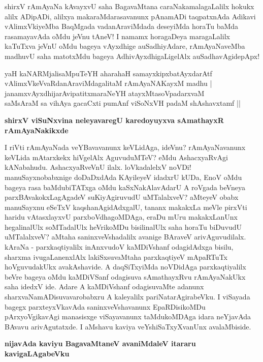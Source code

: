 \noindent
shirxV rAmAyaNa kAvayxvU saha BagavaMtana caraNakamalagaLalilx hokukx alilx ADi\-pADi, alilxya maka\-raMdarasavanunx pAnamADi taqpatxnAda Adikavi vAlimxVkiyeMba BaqMgada vadanAraviMdada deseyiMda hora\-Tu baMda rasamayavAda oMdu jeVnu tAneV! I namamx horagaDeya maragaLalilx kaTuTxva jeVnU oMdu bageya vAyxdhige auSadhiyAdare, rAmAyaNaveMba madhuvU saha matotxMdu bageya AdhivAyxdhigaLi\-gelAlx auSadhavAgidepApx!

\begin{shloka}
yaH kaNARMjalisaMpuTeYH aharahaH samayxkipxbatAyxdarAtf\\\label{238}
vAlimxVkeVvaRdanAraviMdagalitaM rAmAyaNAKayxM madhu |\\
janamxvAyxdhijarAvipatitxmaraNeYH atayxMtasoVpadarxvaM \\
saMsAraM sa vihAya gacaCxti pumAnf viSoNxVH padaM shAshavxtamf ||
\end{shloka}

{\bigskip
\noindent
{\large\bf shirxV viSuNxvina neleyavaregU karedoyuyxva sAmathayxR rAmAyaNakikxde}}\label{page238}
\medskip

\noindent
I riVti rAmAyaNada veYBavavanunx keVLidAga, ideVnu? rAmAyaNavanunx keVLida mAtarxkekx hiV\-gelAlx AguvuduMTeV? eMdu AshacxyaRvAgi kANabahudu. AshacxyaRveVnU ilalx. loVka\-dalelxV\- noVDi! manu\-Sayxnobabxnige doDaDxdAda KAyileyeV idadxrU kUDa, EnoV oMdu bageya rasa baMdubi\-TATxga oMdu kaSxNakAlavAdarU A roVgada beVneya parxBAvakokxLagAgadeV suKiyAgiru\-vudU uMTa\-lalxveV? aMteyeV obabx manuSayxnu eSeTxV kaqshanAgidAdxgalU, tananx makakxLa meVle pirxVti haridu vAtasxlayxvU parxboVdhagoMDAga, eraDu mUru makakxLanUnx hegalinalUlx soMTadalUlx heVrikoMDu bisilinalUlx saha horaTu biDuvudU uMTalalxveV? aMtaha saninxveVshadalilx avanige BAraveV arivAguvudilalx. kAraNa \-- parxkaqtiyalilx inAnxvudoV kaMDiVshanf odagidAdxga bisilu, sharxma ivugaLanenxlAlx lakiSxsuvaMtaha parxkaqtiyeV mApaRTuTx hoVguvudakUkx avakAshavide. A daqSiTxyiMda noVDidAga parxkaqtiyalilx beVre bageya oMdu kaMDiVSanf odagisuva sAmathayxRvu rAmAyaNakUkx saha idedxV ide. Adare A kaMDiVshanf odagisuvaMte adanunx sharxvaNamADisuvavarobabxru A kaleyalilx pariNatarAgirabeVku. I viSayada bagegx parxteyxVkavAda saninxveVshavanunx EpaRDisikoMDu pArxyoVgikavAgi manasisxge viSayavanunx taMdukoMDAga idara neYja\-vAda BAvavu arivAgutatxde. I aMshavu kaviya veYshiSaTxyXvanUnx avalaMbiside.

\newpage
{\noindent
{\large\bf nijavAda kaviyu BagavaMtaneV avaniMdaleV itararu kavigaLAgabeVku}}\label{page239}
\medskip

